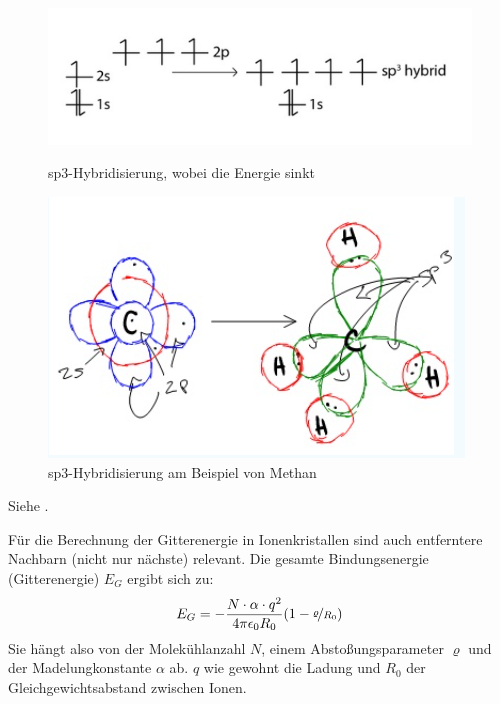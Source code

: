 \begin{itemize}
          \begin{figure}[H]
            \begin{minipage}[b]{0.5\linewidth} 
               \includegraphics[width=0.8\linewidth]{resources/28-11-2018/sp31.PNG}
               \caption{sp3-Hybridisierung, wobei die Energie sinkt}
            \end{minipage}
            \hspace{0.01\linewidth}
            \begin{minipage}[b]{0.5\linewidth} 
               \includegraphics[width=0.8\linewidth]{resources/28-11-2018/sp32.PNG}
               \caption{sp3-Hybridisierung am Beispiel von Methan}
            \end{minipage}
         \end{figure}

\end{itemize}

\label{q:63}

\label{q:64}

Siehe .

\label{q:65}

Für die Berechnung der Gitterenergie in Ionenkristallen sind auch entferntere Nachbarn (nicht nur nächste) relevant. 
Die gesamte Bindungsenergie (Gitterenergie) $E_G$ ergibt sich zu: 
\[E_G = -\frac{N\cdot \alpha \cdot q^2}{4\pi\epsilon_0 R_0}(1-\nicefrac{\varrho}{R_0})\]
Sie hängt also von der Molekühlanzahl $N$, einem Abstoßungsparameter $\varrho$ und der Madelungkonstante $\alpha$ ab. $q$ wie gewohnt die Ladung und $R_0$ der Gleichgewichtsabstand zwischen Ionen. 

